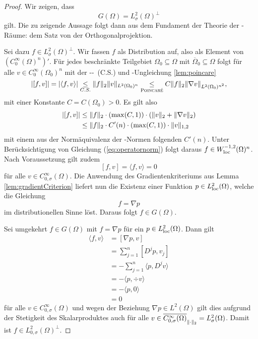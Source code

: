 \begin{proof}
  Wir zeigen, dass 
  \begin{equation}
    \label{eq:orthComplement}
    G(\Omega) = L_\sigma^2(\Omega)^\perp
  \end{equation}
  gilt.
  Die zu zeigende Aussage folgt dann aus dem Fundament der Theorie der \hilbert\hyp{}Räume: dem Satz von der Orthogonalprojektion.

  Sei dazu $f \in L_\sigma^2(\Omega)^\perp$.
  Wir fassen $f$ als Distribution auf, also als Element von $(C_0^\infty(\Omega)^n)'$.
  Für jedes beschränkte Teilgebiet $\Omega_0 \subseteq \Omega$ mit $\overline\Omega_0 \subseteq \Omega$ folgt für alle $v \in C_0^\infty(\Omega_0)^n$ mit der \cauchy\hyp\schwartz-\ (C.S.) und \poincare\hyp{}Ungleichung \ref{lem:poincare}
  $$
  |[f, v]| 
  = |\langle f, v \rangle| 
  \underset{C.S.}{\leq}  \norm{f}_2 \norm{v}_{L^2(\Omega_0)^n}
  \underset{\poincare}{\leq} C \norm{f}_2 \norm{\nabla v}_{L^2(\Omega_0)^{n^2}},
  $$
  mit einer Konstante $C = C(\Omega_0) > 0$.
  Es gilt also 
  \begin{align*}
    |[f, v]| 
    &\leq \norm{f}_2 \cdot ( \max(C,1)) \cdot (\norm{v}_2 + \norm{\nabla v}_2) \\
    &\leq \norm{f}_2 \cdot C'(n) \cdot ( \max(C,1)) \cdot \norm{v}_{1,2}
  \end{align*}
  mit einem aus der Normäquivalenz der \sobolev\hyp{}Normen folgenden $C'(n)$.
  Unter Berücksichtigung von Gleichung (\ref{eq:operatornorm}) folgt daraus $f \in W_{\loc}^{-1,2}(\Omega)^n$.
  Nach Voraussetzung gilt zudem 
  $$
  [f,v] = \langle f, v \rangle = 0
  $$
  für alle $v \in C_{0, \sigma}^\infty(\Omega)$.
  Die Anwendung des Gradientenkriteriums aus Lemma \ref{lem:gradientCriterion} liefert nun die Existenz einer Funktion $p \in L_{\loc}^2(\Omega)$, welche die Gleichung
  $$
  f = \nabla p
  $$
  im distributionellen Sinne löst.
  Daraus folgt $f \in G(\Omega)$.

  Sei umgekehrt $f \in G(\Omega)$ mit $f = \nabla p$ für ein $p \in L^2_{\loc}(\Omega)$.
  Dann gilt
  \begin{align*}
  \langle f, v \rangle
  &= [ \nabla p, v ] \\
  &= \sum_{j = 1}^n [ D^j p , v_j ] \\
  &= - \sum_{j = 1}^n \langle p, D^jv \rangle \\
  &= - \langle p, \div v \rangle  \\
  &= - \langle p, 0 \rangle  \\
  &= 0
  \end{align*}
  für alle $v \in C_{0, \sigma}^\infty(\Omega)$ und wegen der Beziehung $\nabla p \in L^2(\Omega)$ gilt dies aufgrund der Stetigkeit des Skalarproduktes auch für alle $v \in \overline{C_{0, \sigma}^\infty(\Omega)}_{\norm{\cdot}_2} = L_\sigma^2(\Omega)$.
  Damit ist $f \in L_{0,\sigma}^2(\Omega)^\perp$.
\end{proof}

